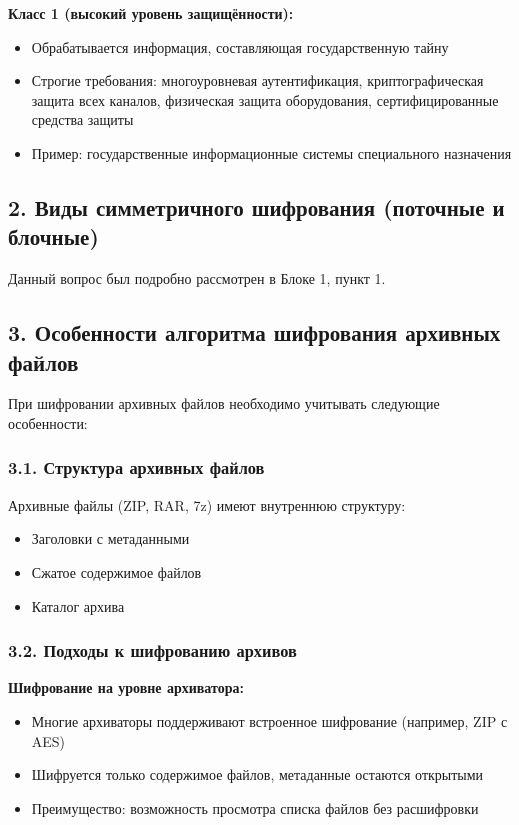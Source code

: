 \textbf{Класс 1 (высокий уровень защищённости):}
\begin{itemize}
    \item Обрабатывается информация, составляющая государственную тайну
    \item Строгие требования: многоуровневая аутентификация, криптографическая защита всех каналов, физическая защита оборудования, сертифицированные средства защиты
    \item Пример: государственные информационные системы специального назначения
\end{itemize}

\subsection*{2. Виды симметричного шифрования (поточные и блочные)}

Данный вопрос был подробно рассмотрен в Блоке 1, пункт 1.

\subsection*{3. Особенности алгоритма шифрования архивных файлов}

При шифровании архивных файлов необходимо учитывать следующие особенности:

\subsubsection*{3.1. Структура архивных файлов}

Архивные файлы (ZIP, RAR, 7z) имеют внутреннюю структуру:
\begin{itemize}
    \item Заголовки с метаданными
    \item Сжатое содержимое файлов
    \item Каталог архива
\end{itemize}

\subsubsection*{3.2. Подходы к шифрованию архивов}

\textbf{Шифрование на уровне архиватора:}
\begin{itemize}
    \item Многие архиваторы поддерживают встроенное шифрование (например, ZIP с AES)
    \item Шифруется только содержимое файлов, метаданные остаются открытыми
    \item Преимущество: возможность просмотра списка файлов без расшифровки
\end{itemize}

